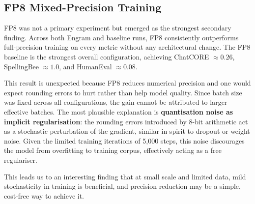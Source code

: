 \subsection{FP8 Mixed-Precision Training}
FP8 was not a primary experiment but emerged as the strongest secondary finding.
Across both Engram and baseline runs, FP8 consistently outperforms full-precision training on
every metric without any architectural change.
The FP8 baseline is the strongest overall configuration, achieving ChatCORE $\approx 0.26$,
SpellingBee $\approx 1.0$, and HumanEval $\approx 0.08$.

This result is unexpected because FP8 reduces numerical precision and one would expect rounding
errors to hurt rather than help model quality. Since batch size was fixed across all configurations,
the gain cannot be attributed to larger effective batches.
The most plausible explanation is \textbf{quantisation noise as implicit regularisation}: the
rounding errors introduced by 8-bit arithmetic act as a stochastic perturbation of the gradient,
similar in spirit to dropout or weight noise.
Given the limited training iterations of 5{,}000 steps, this noise discourages the model from overfitting
to training corpus, effectively acting as a free regulariser.

This leads us to an interesting finding that at small
scale and limited data, mild stochasticity in training is beneficial, and precision reduction may
be a simple, cost-free way to achieve it.